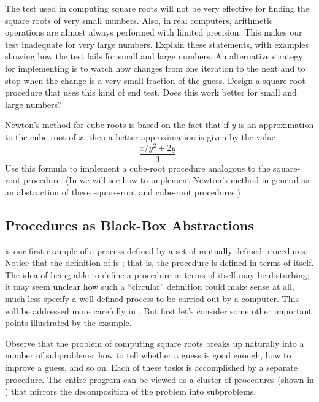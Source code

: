 \begin{exercise}
	\label{Exercise 1.7}
	The  test used in computing square roots will not be very effective for finding the square roots of very small numbers.
	Also, in real computers, arithmetic operations are almost always performed with limited precision.
	This makes our test inadequate for very large numbers.
	Explain these statements, with examples showing how the test fails for small and large numbers.
	An alternative strategy for implementing  is to watch how  changes from one iteration to the next and to stop when the change is a very small fraction of the guess.
	Design a square-root procedure that uses this kind of end test.
	Does this work better for small and large numbers?
\end{exercise}



\begin{exercise}
	\label{Exercise 1.8}
	Newton’s method for cube roots is based on the fact that if \( y \) is an approximation to the cube root of \( x \), then a better approximation is given by the value
	\[
		\frac{x / y^2 + 2y}{3} \,.
	\]
	Use this formula to implement a cube-root procedure analogous to the square-root procedure.
	(In  we will see how to implement Newton’s method in general as an abstraction of these square-root and cube-root procedures.)
\end{exercise}



\subsection{Procedures as Black-Box Abstractions}
\label{Section 1.1.8}

 is our first example of a process defined by a set of mutually defined procedures.
Notice that the definition of  is ;
that is, the procedure is defined in terms of itself.
The idea of being able to define a procedure in terms of itself may be disturbing;
it may seem unclear how such a “circular” definition could make sense at all, much less specify a well-defined process to be carried out by a computer.
This will be addressed more carefully in .
But first let’s consider some other important points illustrated by the  example.

Observe that the problem of computing square roots breaks up naturally into a number of subproblems:
how to tell whether a guess is good enough, how to improve a guess, and so on.
Each of these tasks is accomplished by a separate procedure.
The entire  program can be viewed as a cluster of procedures (shown in ) that mirrors the decomposition of the problem into subproblems.

